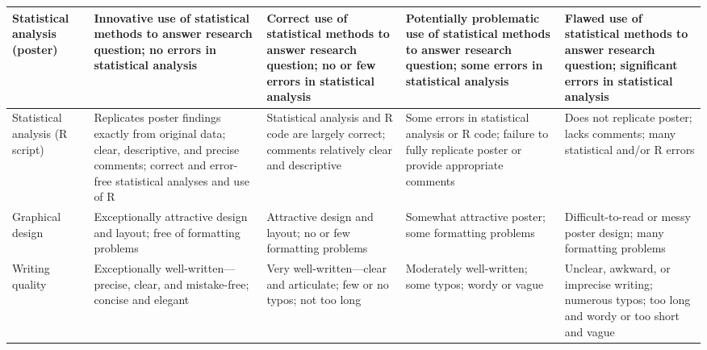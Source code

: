 \documentclass[11pt]{article}
\begin{document}
\begin{center}
\begin{scriptsize}
\begin{tabular}{| p{1.5cm} | p{2.8cm} | p{2.8cm} |  p{2.8cm} |  p{2.8cm} |}
\hline
Statistical analysis (poster) & Innovative use of statistical methods  to answer research question; no errors in statistical analysis & Correct use of statistical methods  to answer research question; no or few errors in statistical analysis & Potentially problematic use of statistical methods  to answer research question; some errors in statistical analysis & Flawed use of statistical methods  to answer research question; significant errors in statistical analysis\\
\hline
Statistical analysis (R script) & Replicates poster findings exactly from original data; clear, descriptive, and precise comments; correct and error-free statistical analyses and use of  R& Statistical analysis and R code are largely correct; comments relatively clear and descriptive & Some errors in statistical analysis or R code; failure to fully replicate poster or provide appropriate comments & Does not replicate poster; lacks comments; many statistical and/or R errors\\
\hline
Graphical design & Exceptionally attractive design and layout; free of formatting problems & Attractive design and layout; no or few formatting problems & Somewhat attractive poster; some formatting problems & Difficult-to-read or messy poster design; many formatting problems\\
\hline
Writing quality & Exceptionally well-written---precise, clear, and mistake-free; concise and elegant & Very well-written---clear and articulate; few or no typos; not too long & Moderately well-written; some typos; wordy or vague & Unclear, awkward, or imprecise writing; numerous typos; too long and wordy or too short and vague\\
\hline
\end{tabular}
\end{scriptsize}
\end{center}






\newpage
\end{document}

